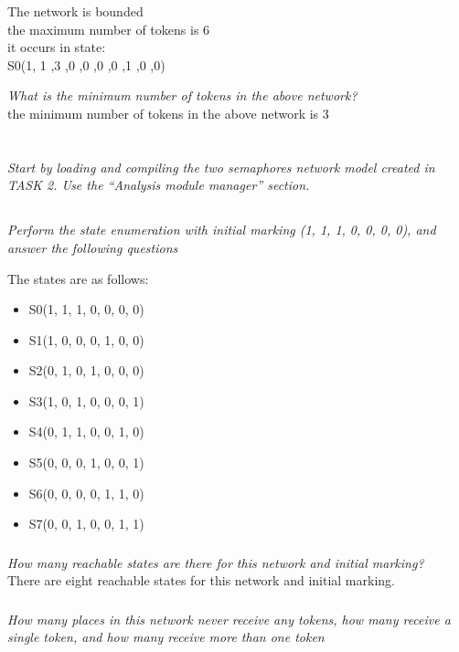 \documentclass[letterpaper]{article}
\begin{document}
\noindent The network is bounded\\
the maximum number of tokens is 6\\
it occurs in state:\\
S0(1, 1 ,3 ,0 ,0 ,0 ,0 ,1 ,0 ,0)

\textit{What is the minimum number of tokens in the above network?}\\

the minimum number of tokens in the above network is 3

\section{}

\textit{Start by loading and compiling the two semaphores network model created in TASK 2. Use the “Analysis module manager” section.}

\subsection{}
\textit{Perform the state enumeration with initial marking (1, 1, 1, 0, 0, 0, 0), and answer the following questions}

The states are as follows:
\begin{itemize}
 \item S0(1, 1, 1, 0, 0, 0, 0)
 \item S1(1, 0, 0, 0, 1, 0, 0)
 \item S2(0, 1, 0, 1, 0, 0, 0)
 \item S3(1, 0, 1, 0, 0, 0, 1)
 \item S4(0, 1, 1, 0, 0, 1, 0)
 \item S5(0, 0, 0, 1, 0, 0, 1)
 \item S6(0, 0, 0, 0, 1, 1, 0)
 \item S7(0, 0, 1, 0, 0, 1, 1)
\end{itemize}

\subsubsection{}
\textit{How many reachable states are there for this network and initial marking?}\\

There are eight reachable states for this network and initial marking.

\subsubsection{}
\textit{How many places in this network never receive any tokens, how many receive a single token, and how many receive more than one token}\\
\end{document}
